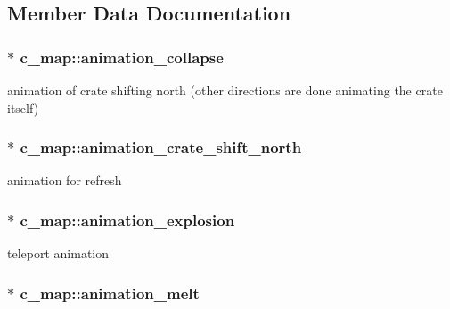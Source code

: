\subsection{Member Data Documentation}
\hypertarget{classc__map_af34abe429db8bba11ccc582a5c2b0b29}{
\subsubsection[{animation\-\_\-collapse}]{$\ast$ c\-\_\-map\-::animation\-\_\-collapse\hspace{0.3cm}{\ttfamily [protected]}}}\label{classc__map_af34abe429db8bba11ccc582a5c2b0b29}
animation of crate shifting north (other directions are done animating the crate itself) \hypertarget{classc__map_ab18a6618eae74007423595aaa606b15c}{
\subsubsection[{animation\-\_\-crate\-\_\-shift\-\_\-north}]{$\ast$ c\-\_\-map\-::animation\-\_\-crate\-\_\-shift\-\_\-north\hspace{0.3cm}{\ttfamily [protected]}}}\label{classc__map_ab18a6618eae74007423595aaa606b15c}
animation for refresh \hypertarget{classc__map_a1be7994a019936dccdf711ca8bfcaba3}{
\subsubsection[{animation\-\_\-explosion}]{$\ast$ c\-\_\-map\-::animation\-\_\-explosion\hspace{0.3cm}{\ttfamily [protected]}}}\label{classc__map_a1be7994a019936dccdf711ca8bfcaba3}
teleport animation \hypertarget{classc__map_a23a9d2c692bc90f9b78f1274f24378e7}{
\subsubsection[{animation\-\_\-melt}]{$\ast$ c\-\_\-map\-::animation\-\_\-melt\hspace{0.3cm}{\ttfamily [protected]}}}\label{classc__map_a23a9d2c692bc90f9b78f1274f24378e7}
